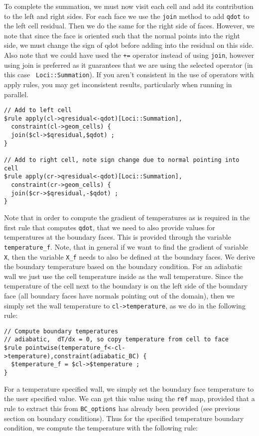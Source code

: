 \documentclass[10pt,epsf,letterpaper,twoside]{book}
\begin{document}
To complete the summation, we must now visit each cell and add its
contribution to the left and right sides.  For each face we use the
{\tt join} method to add {\tt qdot} to the left cell residual.  Then
we do the same for the right side of faces.  However, we note that
since the face is oriented such that the normal points into the right
side, we must change the sign of qdot before adding into the residual
on this side.  Also note that we could have used the {\tt +=} operator
instead of using {\tt join}, however using join is preferred as it
guarantees that we are using the selected operator (in this case {\tt
  Loci::Summation}).  If you aren't consistent in the use of operators
with apply rules, you may get inconsistent results, particularly when
running in parallel.
\begin{verbatim}
// Add to left cell
$rule apply(cl->qresidual<-qdot)[Loci::Summation],
  constraint(cl->geom_cells) {
  join($cl->$qresidual,$qdot) ;
}

// Add to right cell, note sign change due to normal pointing into cell
$rule apply(cr->qresidual<-qdot)[Loci::Summation],
  constraint(cr->geom_cells) {
  join($cr->$qresidual,-$qdot) ;
}
\end{verbatim}

Note that in order to compute the gradient of temperatures as is
required in the first rule that computes {\tt qdot}, that we need to
also provide values for temperatures at the boundary faces.  This is
provided through the variable {\tt temperature\_f}.  Note, that in
general if we want to find the gradient of variable {\tt X}, then the
variable {\tt X\_f} needs to also be defined at the boundary faces.  We
derive the boundary temperature based on the boundary condition.  For
an adiabatic wall we just use the cell temperature inside as the wall
temperature.  Since the temperature of the cell next to the boundary
is on the left side of the boundary face (all boundary faces have
normals pointing out of the domain), then we simply set the wall
temperature to {\tt cl->temperature}, as we do in the following rule:

\begin{verbatim}
// Compute boundary temperatures
// adiabatic,  dT/dx = 0, so copy temperature from cell to face
$rule pointwise(temperature_f<-cl->temperature),constraint(adiabatic_BC) {
  $temperature_f = $cl->$temperature ;
}
\end{verbatim}

For a temperature specified wall, we simply set the boundary face
temperature to the user specified value.  We can get this value using
the {\tt ref} map, provided that a rule to extract this from
{\tt BC\_options} has already been provided (see previous section on boundary
conditions).  Thus for the specified temperature boundary condition,
we compute the temperature with the following rule:
\end{document}
